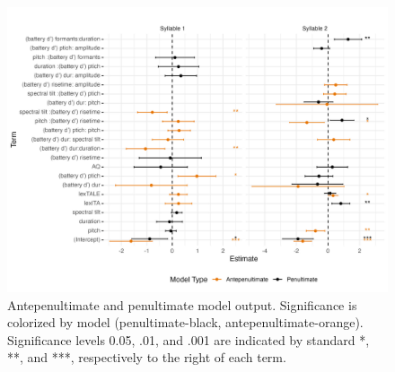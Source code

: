 
\begin{figure}[H]
  \centering
  \includegraphics[width=1\linewidth]{visuals/extended_analysis.jpeg} %
  \caption{Antepenultimate and penultimate model output. Significance is colorized by model (penultimate-black, antepenultimate-orange). Significance levels 0.05, .01, and .001 are indicated by standard *, **, and ***, respectively to the right of each term.}
  \label{fig:extened_analysis}
\end{figure}


